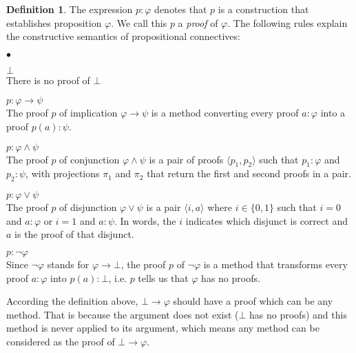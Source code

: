 \documentclass[12pt,a4paper]{article}
\theoremstyle{definition}
\newtheorem{definition}{Definition}[section]
\theoremstyle{plain}
\theoremstyle{plain}
\theoremstyle{plain}
\newenvironment{myitemize}
{\begin{list}{$ \bullet $}{
  \topsep=2pt
  \itemsep=2pt
  \parsep=0pt
  \parskip=0pt
  \labelsep=5pt
  \labelwidth=20pt}}
{\end{list}}
\begin{document}
\begin{definition}
The expression $ p : \varphi $ denotes that $ p $ is a construction that establishes proposition $ \varphi $. We call this $ p $ a \emph{proof} of $ \varphi $. The following rules explain the constructive semantics of propositional connectives:
\begin{myitemize}
\item $ \bot $\\
There is no proof of $ \bot $
\item $ p: \varphi \to \psi $\\
The proof $ p $ of implication $ \varphi \to \psi $ is a method converting every proof $ a : \varphi $ into a proof $ p(a): \psi $.
\item $ p: \varphi \land \psi $\\
The proof $ p $ of conjunction $ \varphi \land \psi $ is a pair of proofs $ \langle p_1 , p_2 \rangle $ such that $ p_1:\varphi $ and $ p_2:\psi $, with projections $ \pi _1 $ and $ \pi _2 $ that return the first and second proofs in a pair.
\item $ p: \varphi \lor \psi $\\
The proof $ p $ of disjunction $ \varphi \lor \psi $ is a pair $ \langle i , a \rangle $ where $ i \in \{ 0,1 \} $ such that $ i = 0 $ and $ a : \varphi $ or $ i = 1 $ and $ a : \psi $. In words, the $ i $ indicates which disjunct is correct and $ a $ is the proof of that disjunct.
\item $ p: \neg \varphi $\\
Since $ \neg \varphi $ stands for $ \varphi \to \bot $, the proof $ p $ of $ \neg \varphi $ is a method that transforms every proof $ a: \varphi $ into $ p(a): \bot$, i.e. $ p $ tells us that $ \varphi $ has no proofs.
\end{myitemize}
\end{definition}

According the definition above, $ \bot \to \varphi $ should have a proof which can be any method. That is because the argument does not exist ($ \bot $ has no proofs) and this method is never applied to its argument, which means any method can be considered as the proof of $ \bot \to \varphi $.
\end{document}
